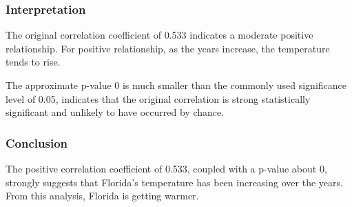 \documentclass{article}
\begin{document}
{\selectfont\subsubsection*{Interpretation}

The original correlation coefficient of 0.533 indicates a moderate positive relationship. For positive relationship, as the years increase, the temperature tends to rise.

The approximate p-value 0 is much smaller than the commonly used significance level of 0.05, indicates that the original correlation is strong statistically significant and unlikely to have occurred by chance.}
 
{\selectfont\subsubsection*{Conclusion}

The positive correlation coefficient of 0.533, coupled with a p-value about 0, strongly suggests that Florida’s temperature has been increasing over the years. From this analysis, Florida is getting warmer.}
 
\end{document}
